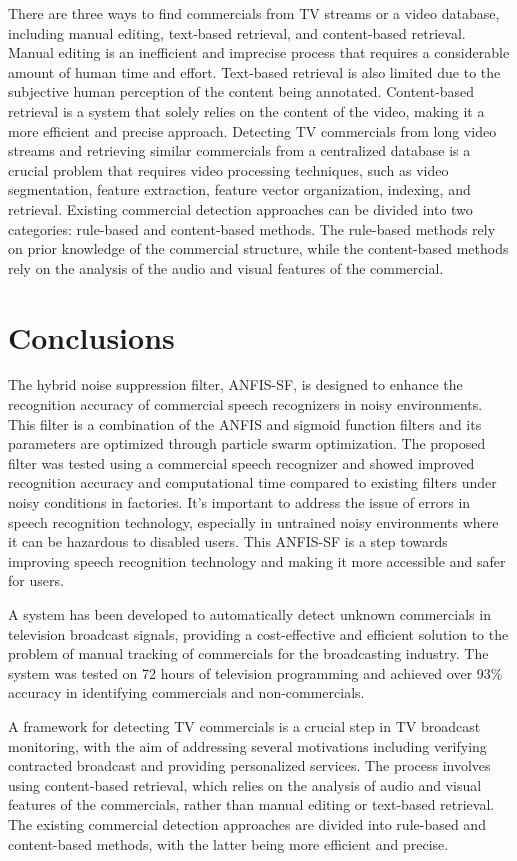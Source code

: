 \documentclass[12pt, twoside]{article}
\begin{document}
There are three ways to find commercials from TV streams or a video database, including manual editing, text-based retrieval, and content-based retrieval. Manual editing is an inefficient and imprecise process that requires a considerable amount of human time and effort. Text-based retrieval is also limited due to the subjective human perception of the content being annotated. Content-based retrieval is a system that solely relies on the content of the video, making it a more efficient and precise approach. Detecting TV commercials from long video streams and retrieving similar commercials from a centralized database is a crucial problem that requires video processing techniques, such as video segmentation, feature extraction, feature vector organization, indexing, and retrieval. Existing commercial detection approaches can be divided into two categories: rule-based and content-based methods. The rule-based methods rely on prior knowledge of the commercial structure, while the content-based methods rely on the analysis of the audio and visual features of the commercial.


\section{Conclusions}
The hybrid noise suppression filter, ANFIS-SF, is designed to enhance the recognition accuracy of commercial speech recognizers in noisy environments. This filter is a combination of the ANFIS and sigmoid function filters and its parameters are optimized through particle swarm optimization. The proposed filter was tested using a commercial speech recognizer and showed improved recognition accuracy and computational time compared to existing filters under noisy conditions in factories. It’s important to address the issue of errors in speech recognition technology, especially in untrained noisy environments where it can be hazardous to disabled users. This ANFIS-SF is a step towards improving speech recognition technology and making it more accessible and safer for users.

A system has been developed to automatically detect unknown commercials in television broadcast signals, providing a cost-effective and efficient solution to the problem of manual tracking of commercials for the broadcasting industry. The system was tested on 72 hours of television programming and achieved over 93\% accuracy in identifying commercials and non-commercials.

A framework for detecting TV commercials is a crucial step in TV broadcast monitoring, with the aim of addressing several motivations including verifying contracted broadcast and providing personalized services. The process involves using content-based retrieval, which relies on the analysis of audio and visual features of the commercials, rather than manual editing or text-based retrieval. The existing commercial detection approaches are divided into rule-based and content-based methods, with the latter being more efficient and precise.
\end{document}
